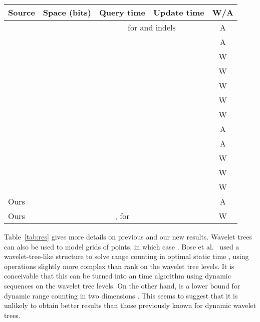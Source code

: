 \documentclass[11pt]{article}
\begin{document}
\begin{sidewaystable}[p]
\caption{History of results on managing dynamic sequences  over alphabet
, assuming  to simplify. 
Some results \cite{HSS03,BB04,CHL04} were presented only for binary 
sequences and the result we give is obtained 
by using them in combination with wavelet trees.
Column W/A tells whether the update times are (W)orst-case or (A)mortized.}
\label{tab:res}
\begin{center}
\footnotesize
\begin{tabular}{l|c|c|c|c}
Source & Space (bits) & Query time & Update time & W/A \\
\hline
\cite{FS89} &    & \multicolumn{2}{c|}{ for  and indels} & A \\
\hline
\cite{HSS03,HSS11} &  &  &  & A \\
\cite{CHL04} &  &  &  & W \\
\cite{BB04} &  &  &  & W \\
\cite{MN06,MN08} &  &  &  & W \\
            &  &  &  & W \\
\cite{CHLS07} &  &  &  & W \\
\cite{GHSV07} &  &  &  & A \\
\cite{LP07,LP09} &  &  &  & A \\
\cite{GN08,GN09} &  &  &  & W \\
\cite{HM10} &  &  &  & W \\
\cite{NS10} &  &  &  & W \\
\hline
Ours   &  &  &  & A \\
Ours   &  & ,  for  &  & W \\
\end{tabular}
\end{center}
\end{sidewaystable}

Table~\ref{tab:res} gives more details on previous and our new results.
Wavelet trees can also be used to model  grids of points, in 
which case . Bose et al.~\cite{BHMM09} used a wavelet-tree-like
structure to solve range counting in optimal static time ,
using operations slightly more complex than rank on the wavelet tree levels.
It is conceivable that this can be turned into an 
time algorithm using dynamic sequences on the wavelet tree levels. On the
other hand,  is a lower bound for dynamic range
counting in two dimensions \cite{Pat07}. This seems to suggest that it is
unlikely to obtain better results than those previously known for dynamic 
wavelet trees.
\end{document}
